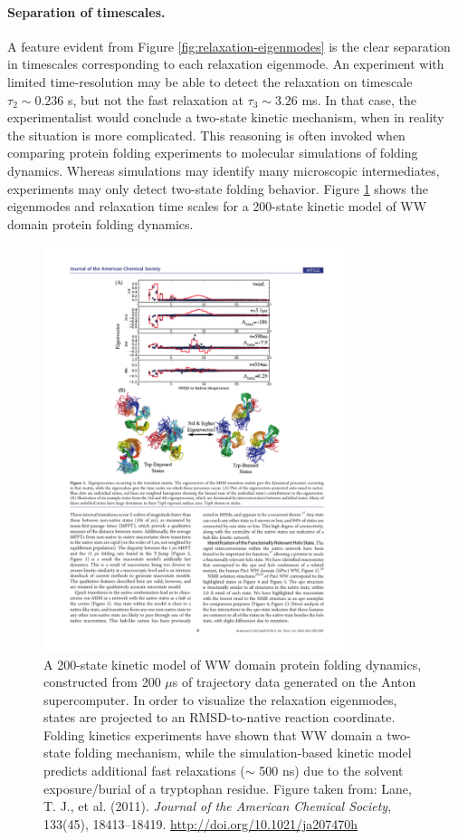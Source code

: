 \documentclass[11pt, oneside]{article}   	%
\begin{document}
\paragraph{Separation of timescales.} A feature evident from Figure \ref{fig:relaxation-eigenmodes} is the clear separation in timescales corresponding to each relaxation eigenmode.  An experiment with limited time-resolution may be able to detect the relaxation on timescale $\tau_2 \sim 0.236$ s, but not the fast relaxation at $\tau_3 \sim 3.26$ ms.   In that case, the experimentalist would conclude a two-state kinetic mechanism, when in reality the situation is more complicated.    This reasoning is often invoked when comparing protein folding experiments to molecular simulations of folding dynamics.  Whereas simulations may identify many microscopic intermediates, experiments may only detect two-state folding behavior.  Figure \ref{fig:ww-eigenmodes} shows the eigenmodes and relaxation time scales for a 200-state kinetic model of WW domain protein folding dynamics. 

\begin{figure}[htbp]
\includegraphics[width=0.8\textwidth]{ww-eigenmodes}
\caption{\label{fig:ww-eigenmodes}A 200-state kinetic model of WW domain protein folding dynamics, constructed from 200 $\mu$s of trajectory data generated on the Anton supercomputer. In order to visualize the relaxation eigenmodes, states are projected to an RMSD-to-native reaction coordinate.  Folding kinetics experiments have shown that  WW domain a two-state folding mechanism, while the simulation-based kinetic model predicts additional fast relaxations ($\sim$ 500 ns) due to the solvent exposure/burial of a tryptophan residue. Figure taken from:  Lane, T. J., et al. (2011). \textit{Journal of the American Chemical Society}, 133(45), 18413--18419. \url{http://doi.org/10.1021/ja207470h} }
\end{figure}
\end{document}
